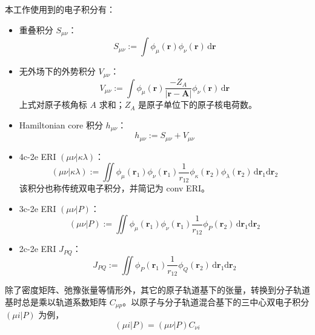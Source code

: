 本工作使用到的电子积分有：
\begin{itemize}[nosep]
  \item 重叠积分 $S_{\mu \nu}$：
        \begin{equation}
          S_{\mu \nu} := \int \phi_\mu (\bm{r}) \phi_\nu (\bm{r}) \, \mathrm{d} \bm{r}
        \end{equation}
  \item 无外场下的外势积分 $V_{\mu \nu}$：
        \begin{equation}
          V_{\mu \nu} := \int \phi_\mu (\bm{r}) \frac{- Z_A}{|\bm{r} - \bm{A}|} \phi_\nu (\bm{r}) \, \mathrm{d} \bm{r}
        \end{equation}
        上式对原子核角标 $A$ 求和；$Z_A$ 是原子单位下的原子核电荷数。
  \item Hamiltonian core 积分 $h_{\mu \nu}$：
        \begin{equation}
          h_{\mu \nu} := S_{\mu \nu} + V_{\mu \nu}
        \end{equation}
  \item 4c-2e ERI $(\mu \nu | \kappa \lambda)$：
        \begin{equation}
          (\mu \nu | \kappa \lambda) := \iint \phi_\mu (\bm{r}_1) \phi_\nu (\bm{r}_1) \frac{1}{r_{12}} \phi_\kappa (\bm{r}_2) \phi_\lambda (\bm{r}_2) \, \mathrm{d} \bm{r}_1 \mathrm{d} \bm{r}_2
        \end{equation}
        该积分也称传统双电子积分，并简记为 conv ERI。
  \item 3c-2e ERI $(\mu \nu | P)$：
        \begin{equation}
          (\mu \nu | P) := \iint \phi_\mu (\bm{r}_1) \phi_\nu (\bm{r}_1) \frac{1}{r_{12}} \phi_P (\bm{r}_2) \, \mathrm{d} \bm{r}_1 \mathrm{d} \bm{r}_2
        \end{equation}
  \item 2c-2e ERI $J_{PQ}$：
        \begin{equation}
          J_{PQ} := \iint \phi_P (\bm{r}_1) \frac{1}{r_{12}} \phi_Q (\bm{r}_2) \, \mathrm{d} \bm{r}_1 \mathrm{d} \bm{r}_2
        \end{equation}
\end{itemize}

除了密度矩阵、弛豫张量等情形外，其它的原子轨道基下的张量，转换到分子轨道基时总是乘以轨道系数矩阵 $C_{\mu p}$。以原子与分子轨道混合基下的三中心双电子积分 $(\mu i | P)$ 为例，
\begin{equation*}
  (\mu i | P) = (\mu \nu | P) C_{\nu i}
\end{equation*}

